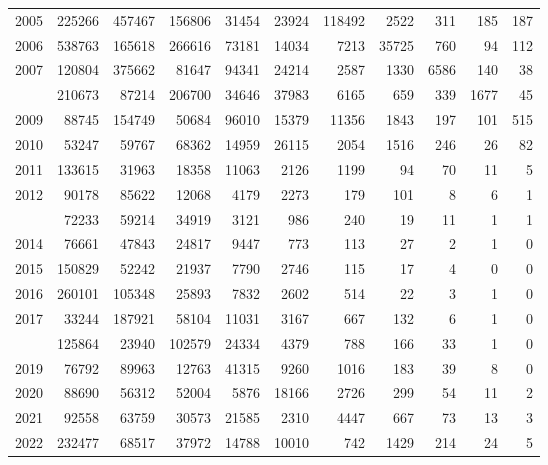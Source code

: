 \documentclass[
]{article}
\begin{document}
\begin{longtable}[t]{lrrrrrrrrrr}
2005 & 225266 & 457467 & 156806 & 31454 & 23924 & 118492 & 2522 & 311 & 185 & 187\\
2006 & 538763 & 165618 & 266616 & 73181 & 14034 & 7213 & 35725 & 760 & 94 & 112\\
2007 & 120804 & 375662 & 81647 & 94341 & 24214 & 2587 & 1330 & 6586 & 140 & 38\\
\addlinespace
2008 & 210673 & 87214 & 206700 & 34646 & 37983 & 6165 & 659 & 339 & 1677 & 45\\
2009 & 88745 & 154749 & 50684 & 96010 & 15379 & 11356 & 1843 & 197 & 101 & 515\\
2010 & 53247 & 59767 & 68362 & 14959 & 26115 & 2054 & 1516 & 246 & 26 & 82\\
2011 & 133615 & 31963 & 18358 & 11063 & 2126 & 1199 & 94 & 70 & 11 & 5\\
2012 & 90178 & 85622 & 12068 & 4179 & 2273 & 179 & 101 & 8 & 6 & 1\\
\addlinespace
2013 & 72233 & 59214 & 34919 & 3121 & 986 & 240 & 19 & 11 & 1 & 1\\
2014 & 76661 & 47843 & 24817 & 9447 & 773 & 113 & 27 & 2 & 1 & 0\\
2015 & 150829 & 52242 & 21937 & 7790 & 2746 & 115 & 17 & 4 & 0 & 0\\
2016 & 260101 & 105348 & 25893 & 7832 & 2602 & 514 & 22 & 3 & 1 & 0\\
2017 & 33244 & 187921 & 58104 & 11031 & 3167 & 667 & 132 & 6 & 1 & 0\\
\addlinespace
2018 & 125864 & 23940 & 102579 & 24334 & 4379 & 788 & 166 & 33 & 1 & 0\\
2019 & 76792 & 89963 & 12763 & 41315 & 9260 & 1016 & 183 & 39 & 8 & 0\\
2020 & 88690 & 56312 & 52004 & 5876 & 18166 & 2726 & 299 & 54 & 11 & 2\\
2021 & 92558 & 63759 & 30573 & 21585 & 2310 & 4447 & 667 & 73 & 13 & 3\\
2022 & 232477 & 68517 & 37972 & 14788 & 10010 & 742 & 1429 & 214 & 24 & 5\\*
\end{longtable}
\end{document}
